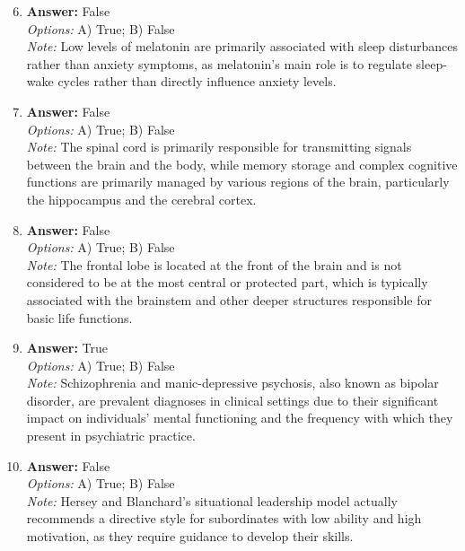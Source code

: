 \documentclass[12pt]{article}
\begin{document}
\begin{enumerate}[label=\arabic*.]
\setcounter{enumi}{5}
\item \textbf{Answer:} False
\\ \textit{Options:} A) True; B) False
\\ \textit{Note:} Low levels of melatonin are primarily associated with sleep disturbances rather than anxiety symptoms, as melatonin's main role is to regulate sleep-wake cycles rather than directly influence anxiety levels.
\item \textbf{Answer:} False
\\ \textit{Options:} A) True; B) False
\\ \textit{Note:} The spinal cord is primarily responsible for transmitting signals between the brain and the body, while memory storage and complex cognitive functions are primarily managed by various regions of the brain, particularly the hippocampus and the cerebral cortex.
\item \textbf{Answer:} False
\\ \textit{Options:} A) True; B) False
\\ \textit{Note:} The frontal lobe is located at the front of the brain and is not considered to be at the most central or protected part, which is typically associated with the brainstem and other deeper structures responsible for basic life functions.
\item \textbf{Answer:} True
\\ \textit{Options:} A) True; B) False
\\ \textit{Note:} Schizophrenia and manic-depressive psychosis, also known as bipolar disorder, are prevalent diagnoses in clinical settings due to their significant impact on individuals' mental functioning and the frequency with which they present in psychiatric practice.
\item \textbf{Answer:} False
\\ \textit{Options:} A) True; B) False
\\ \textit{Note:} Hersey and Blanchard's situational leadership model actually recommends a directive style for subordinates with low ability and high motivation, as they require guidance to develop their skills.
\end{enumerate}
\end{document}
